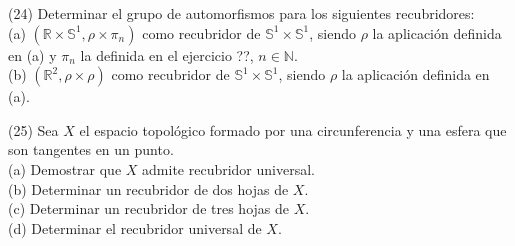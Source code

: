 \documentclass[
  a4paper,
  spanish,
  12pt,
]{scrartcl}
\begin{document}
\begin{ejer}
(24) Determinar el grupo de automorfismos para los siguientes recubridores:\\
(a) $\left(\mathbb{R} \times \mathbb{S}^{1}, \rho \times \pi_{n}\right)$ como recubridor de $\mathbb{S}^{1} \times \mathbb{S}^{1}$, siendo $\rho$ la aplicación definida en (a) y $\pi_{n}$ la definida en el ejercicio ??, $n \in \mathbb{N}$.\\
(b) $\left(\mathbb{R}^{2}, \rho \times \rho\right)$ como recubridor de $\mathbb{S}^{1} \times \mathbb{S}^{1}$, siendo $\rho$ la aplicación definida en (a).\\
\end{ejer}

\begin{ejer}
(25) Sea $X$ el espacio topológico formado por una circunferencia y una esfera que son tangentes en un punto.\\
(a) Demostrar que $X$ admite recubridor universal.\\
(b) Determinar un recubridor de dos hojas de $X$.\\
(c) Determinar un recubridor de tres hojas de $X$.\\
(d) Determinar el recubridor universal de $X$.
\end{ejer}
\end{document}
